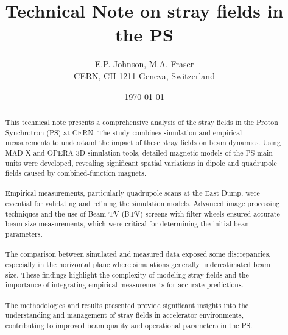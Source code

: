 \documentclass{cernatsnote}
\title{Technical Note on stray fields in the PS}
\author{
	E.P. Johnson, M.A. Fraser\; \\		
	CERN, CH-1211 Geneva, Switzerland
}
\date{\today}
\begin{document}
\maketitle

\begin{abstract}
This technical note presents a comprehensive analysis of the stray fields in the Proton Synchrotron (PS) at CERN. The study combines simulation and empirical measurements to understand the impact of these stray fields on beam dynamics. Using MAD-X and OPERA-3D simulation tools, detailed magnetic models of the PS main units were developed, revealing significant spatial variations in dipole and quadrupole fields caused by combined-function magnets.
\\
\\
Empirical measurements, particularly quadrupole scans at the East Dump, were essential for validating and refining the simulation models. Advanced image processing techniques and the use of Beam-TV (BTV) screens with filter wheels ensured accurate beam size measurements, which were critical for determining the initial beam parameters.
\\
\\
The comparison between simulated and measured data exposed some discrepancies, especially in the horizontal plane where simulations generally underestimated beam size. These findings highlight the complexity of modeling stray fields and the importance of integrating empirical measurements for accurate predictions.
\\
\\
The methodologies and results presented provide significant insights into the understanding and management of stray fields in accelerator environments, contributing to improved beam quality and operational parameters in the PS.

\end{abstract}
\\ \\ \\ 
\newpage

\begingroup
\color{black}
\tableofcontents
\endgroup

\pagebreak




\end{document}
